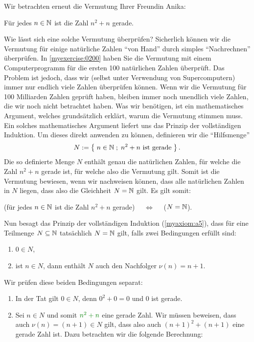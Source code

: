 \begin{myexample}\label{myexample:InduktionEven}
Wir betrachten erneut die Vermutung Ihrer Freundin Anika:
\begin{center}
	Für jedes $n\in\mathbb{N}$ ist die Zahl $n^2+n$ gerade.
\end{center}
Wie lässt sich eine solche Vermutung überprüfen? Sicherlich können wir die Vermutung für einige natürliche Zahlen \enquote{von Hand} durch simples \enquote{Nachrechnen} überprüfen. In \cref{myexercise:0200} haben Sie die Vermutung mit einem Computerprogramm für die ersten 100 natürlichen Zahlen überprüft. Das Problem ist jedoch, dass wir (selbst unter Verwendung von Supercomputern) immer nur endlich viele Zahlen überprüfen können. Wenn wir die Vermutung für 100 Milliarden Zahlen geprüft haben, bleiben immer noch unendlich viele Zahlen, die wir noch nicht betrachtet haben. Was wir benötigen, ist ein mathematisches Argument, welches grundsätzlich erklärt, warum die Vermutung stimmen muss. Ein solches mathematisches Argument liefert uns das Prinzip der vollständigen Induktion. Um dieses direkt anwenden zu können, definieren wir die \enquote{Hilfsmenge}
\begin{align*}
	N:=\left\{\;n\in\mathbb{N} \; ; \; \text{$n^2+n$ ist gerade} \;\right\}.
\end{align*}
Die so definierte Menge $N$ enthält genau die natürlichen Zahlen, für welche die Zahl $n^2+n$ gerade ist, für welche also die Vermutung gilt. Somit ist die Vermutung bewiesen, wenn wir nachweisen können, dass alle natürlichen Zahlen in $N$ liegen, dass also die Gleichheit $N=\mathbb{N}$ gilt. Es gilt somit:
\begin{center}
	(für jedes $n\in\mathbb{N}$ ist die Zahl $n^2+n$ gerade) $\quad\iff\quad$ ($N = \mathbb{N}$).
\end{center}
Nun besagt das Prinzip der vollständigen Induktion (\cref{myaxiom:a5}), dass für eine Teilmenge $N\subseteq\mathbb{N}$ tatsächlich $N=\mathbb{N}$ gilt, falls zwei Bedingungen erfüllt sind:
\begin{enumerate}
	\item $0\in N$,
	\item ist $n\in N$, dann enthält $N$ auch den Nachfolger $\nu(n) = n+1$.
\end{enumerate}
Wir prüfen diese beiden Bedingungen separat:
\begin{enumerate}
	\item In der Tat gilt $0\in N$, denn $0^2+0 = 0$ und $0$ ist gerade. \checkmark
	\item Sei $n\in N$ und somit $\textcolor{Green}{n^2+n}$ eine gerade Zahl. Wir müssen beweisen, dass auch $\nu(n)=(n+1)\in N$ gilt, dass also auch $(n+1)^2+(n+1)$ eine gerade Zahl ist. Dazu betrachten wir die folgende Berechnung:

\end{enumerate}
\end{myexample}
